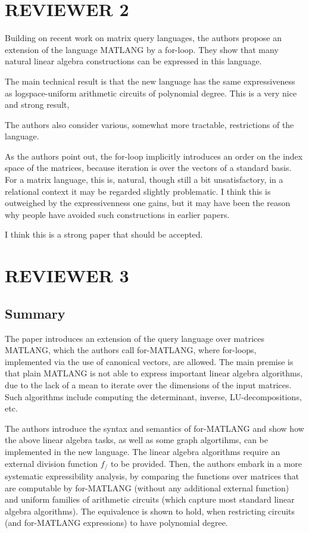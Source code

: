 \documentclass[a4paper]{article}
\begin{document}
\newpage

\section*{REVIEWER 2}

Building on recent work on matrix query languages, the authors
propose an extension of the language MATLANG by a for-loop. They show
that many natural linear algebra constructions can be expressed in
this language.

The main technical result is that the new language has the same
expressiveness as logspace-uniform arithmetic circuits of polynomial degree.
This is a very nice and strong result,

The authors also consider various, somewhat more tractable,
restrictions of the language.

As the authors point out, the for-loop implicitly introduces an order
on the index space of the matrices, because iteration is over the
vectors of a standard basis. For a matrix language, this is,
natural, though still a bit unsatisfactory, in a relational context
it may be regarded slightly problematic. I think this is outweighed
by the expressivenness one gains, but it may have been the reason why
people have avoided such constructions in earlier papers.

I think this is a strong paper that should be accepted.

\newpage

\section*{REVIEWER 3}

\subsection*{Summary}

The paper introduces an extension of the query language over matrices MATLANG, which the authors call for-MATLANG, where for-loops, 
implemented via the use of canonical vectors, are allowed.
The main premise is that plain MATLANG is not able to express important linear algebra algorithms, 
due to the lack of a mean to iterate over the dimensions of the input matrices.
Such algorithms include computing the determinant, inverse, LU-decompositions, etc.

The authors introduce the syntax and semantics of for-MATLANG and show how the above linear algebra tasks, 
as well as some graph algortihms, can be implemented in the new language.
The linear algebra algorithms require an external division function $f_/$ to be provided.
Then, the authors embark in a more systematic expressibility analysis, by comparing the functions over matrices that are 
computable by for-MATLANG (without any additional external function) and uniform families of arithmetic circuits (which 
capture most standard linear algebra algorithms).
The equivalence is shown to hold, when restricting circuits (and for-MATLANG expressions) to have polynomial degree.
\end{document}
